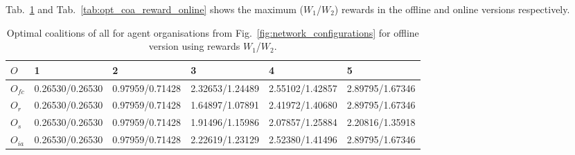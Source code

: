 \documentclass{llncs}
\begin{document}
\begin{table}
 \centering
{}

\caption{Values for maximum probabilities to complete both tasks for coalitions from Tab.~\ref{tab:optimal_coalitions}.} \label{tab:optimal_2task}
\end{table}


Tab.~\ref{tab:opt_coa_reward_offline} and Tab.~\ref{tab:opt_coa_reward_online} shows the maximum ($W_1$/$W_2$) rewards in the offline and online versions respectively.


\begin{table}
 \centering
 \begin{tabular}{ | l | l | l | l | l | l |}
    \hline
    $O$ & 1& 2 & 3 & 4 & 5 \\ \hline
    $O_{fc}$ & 0.26530/0.26530  & 0.97959/0.71428  &  2.32653/1.24489  &  2.55102/1.42857   &  2.89795/1.67346  \\ \hline
    $O_r$ &  0.26530/0.26530   & 0.97959/0.71428  &  1.64897/1.07891  &  2.41972/1.40680   &  2.89795/1.67346 \\ \hline
    $O_s$ &  0.26530/0.26530   &  0.97959/0.71428  & 1.91496/1.15986  &  2.07857/1.25884   &  2.20816/1.35918  \\ \hline
    $O_{ia}$ & 0.26530/0.26530   &  0.97959/0.71428  &  2.22619/1.23129  &  2.52380/1.41496   &  2.89795/1.67346  \\ \hline
\end{tabular}
\caption{Optimal coalitions of all for agent organisations from Fig.~\ref{fig:network_configurations} for offline version using rewards $W_1$/$W_2$.}
\label{tab:opt_coa_reward_offline}
\end{table}
\end{document}
